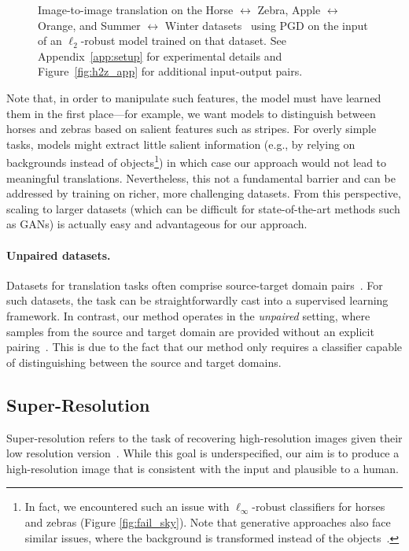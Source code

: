 \documentclass{article}
\newcommand{\HtoZ}{Horse $\leftrightarrow$ Zebra}
\newcommand{\StoW}{Summer $\leftrightarrow$ Winter}
\newcommand{\AtoO}{Apple $\leftrightarrow$ Orange}
\begin{document}
{\begin{figure}[htp]
\begin{center}
    \end{center}
    \caption{Image-to-image translation on the {\HtoZ}, {\AtoO},
    and {\StoW} datasets~\cite{zhu2017unpaired} using PGD on the input of an
    $\ell_2$-robust model trained on that dataset.
    See Appendix~\ref{app:setup} for experimental details and 
    Figure~\ref{fig:h2z_app} for additional input-output pairs.}
    \label{fig:h2z}
\end{figure}

Note that, in order to manipulate such features, the model must have learned
them in the first place---for example, we want models to distinguish between
horses and zebras based on salient features such as stripes. For overly simple
 tasks, models might extract little
salient information (e.g., by relying on backgrounds instead of objects\footnote{In
    fact, we encountered such an issue with $\ell_\infty$-robust classifiers for
horses and zebras (Figure \ref{fig:fail_sky}). Note that generative
approaches also face similar issues, where the background is transformed instead
of the objects~\citep{zhu2017unpaired}.})
in which case our approach would not lead to meaningful translations.
Nevertheless, this not a fundamental barrier and
can be addressed by training on richer, more challenging datasets.
From this perspective, scaling to larger datasets (which can be difficult for
state-of-the-art methods such as GANs) is actually easy and advantageous for our approach.

\paragraph{Unpaired datasets.} Datasets for translation tasks
often comprise source-target domain pairs~\cite{isola2017image}.
For such datasets, the task can be straightforwardly cast into a supervised
learning framework.
In contrast, our method operates in the {\em unpaired} setting, where
samples from the source and target domain are provided without an
explicit pairing~\cite{zhu2017unpaired}.
This is due to the fact that our method only requires a classifier capable
of distinguishing between the source and target domains.
 
\subsection{Super-Resolution}
\label{sec:superresolution}
Super-resolution refers to the task of recovering high-resolution images given 
their low resolution version~\cite{dabov2007video,burger2012image}.
While this goal is underspecified, our aim is
to produce a high-resolution image that is consistent with the input and
plausible to a human. 

}
\end{document}
